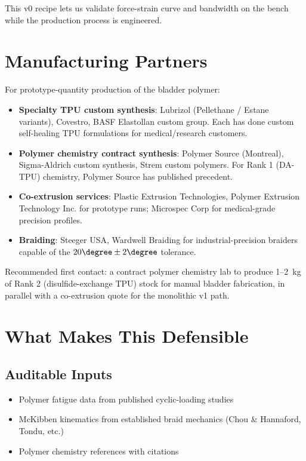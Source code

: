 \documentclass[11pt, a4paper]{article}
\begin{document}
This v0 recipe lets us validate force-strain curve and bandwidth
on the bench while the production process is engineered.

\section{Manufacturing Partners}

For prototype-quantity production of the bladder polymer:

\begin{itemize}[nosep]
  \item \textbf{Specialty TPU custom synthesis}: Lubrizol
        (Pellethane / Estane variants), Covestro, BASF Elastollan
        custom group. Each has done custom self-healing TPU
        formulations for medical/research customers.
  \item \textbf{Polymer chemistry contract synthesis}:
        Polymer Source (Montreal), Sigma-Aldrich custom synthesis,
        Strem custom polymers. For Rank 1 (DA-TPU) chemistry,
        Polymer Source has published precedent.
  \item \textbf{Co-extrusion services}: Plastic Extrusion
        Technologies, Polymer Extrusion Technology Inc. for
        prototype runs; Microspec Corp for medical-grade
        precision profiles.
  \item \textbf{Braiding}: Steeger USA, Wardwell Braiding
        for industrial-precision braiders capable of the
        $20\degree \pm 2\degree$ tolerance.
\end{itemize}

Recommended first contact: a contract polymer chemistry lab to
produce 1--2~kg of Rank 2 (disulfide-exchange TPU) stock for
manual bladder fabrication, in parallel with a co-extrusion
quote for the monolithic v1 path.

\section{What Makes This Defensible}

\subsection{Auditable Inputs}

\begin{itemize}[nosep]
  \item Polymer fatigue data from published cyclic-loading studies
  \item McKibben kinematics from established braid mechanics
        (Chou \& Hannaford, Tondu, etc.)
  \item Polymer chemistry references with citations
\end{itemize}
\end{document}

